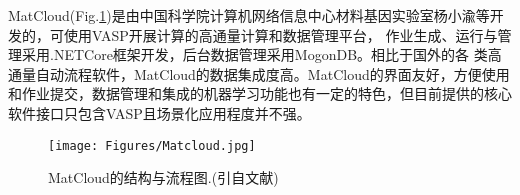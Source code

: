 \textrm{MatCloud}(\textrm{Fig.}\ref{Auto_Flow_Platform-6})是由中国科学院计算机网络信息中心材料基因实验室杨小渝等开发的，可使用\textrm{VASP}开展计算的高通量计算和数据管理平台，%
作业生成、运行与管理采用\textrm{.NETCore}框架开发，后台数据管理采用\textrm{MogonDB}。相比于国外的各 类高通量自动流程软件，\textrm{MatCloud}的数据集成度高。\textrm{MatCloud}的界面友好，方便使用和作业提交，数据管理和集成的机器学习功能也有一定的特色，但目前提供的核心软件接口只包含\textrm{VASP}且场景化应用程度并不强。

\begin{figure}[h!]
\centering
\texttt{[image: Figures/Matcloud.jpg]}%
\caption{\textrm{MatCloud}的结构与流程图.(引自文献\cite{CMS146-319_2018})}
\label{Auto_Flow_Platform-6}
\end{figure}

